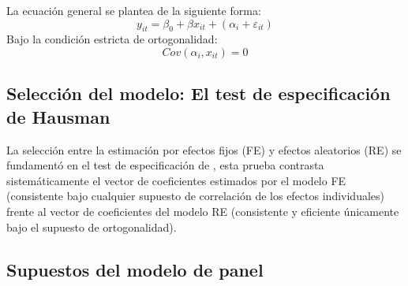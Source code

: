 La ecuación general se plantea de la siguiente forma:
\begin{equation}
    y_{it} = \beta_0 + \beta x_{it} + (\alpha_i + \varepsilon_{it})
\end{equation}
Bajo la condición estricta de ortogonalidad:
\begin{equation}
    Cov(\alpha_i, x_{it}) = 0
\end{equation}

\subsection{Selección del modelo: El test de especificación de Hausman}

 La selección entre la estimación por efectos fijos (FE) y efectos aleatorios (RE) se fundamentó en el test de especificación de , esta prueba contrasta sistemáticamente el vector de coeficientes estimados por el modelo FE (consistente bajo cualquier supuesto de correlación de los efectos individuales) frente al vector de coeficientes del modelo RE (consistente y eficiente únicamente bajo el supuesto de ortogonalidad). 

\subsection{Supuestos del modelo de panel}

